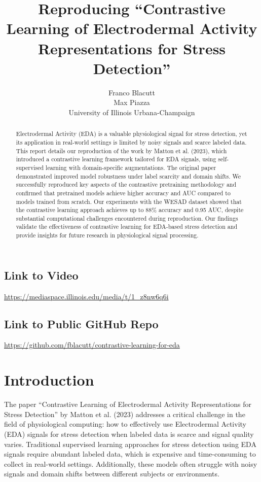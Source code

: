 \documentclass[10pt,letterpaper,twocolumn]{article}
\title{\Large\bf Reproducing ``Contrastive Learning of Electrodermal Activity Representations for Stress Detection''}
\author{Franco Blacutt\\
Max Piazza\\
University of Illinois Urbana-Champaign}
\date{}
\begin{document}
\maketitle

\begin{abstract}
Electrodermal Activity (EDA) is a valuable physiological signal for stress detection, yet its application in real-world settings is limited by noisy signals and scarce labeled data. This report details our reproduction of the work by Matton et al. (2023), which introduced a contrastive learning framework tailored for EDA signals, using self-supervised learning with domain-specific augmentations. The original paper demonstrated improved model robustness under label scarcity and domain shifts. We successfully reproduced key aspects of the contrastive pretraining methodology and confirmed that pretrained models achieve higher accuracy and AUC compared to models trained from scratch. Our experiments with the WESAD dataset showed that the contrastive learning approach achieves up to 88\% accuracy and 0.95 AUC, despite substantial computational challenges encountered during reproduction. Our findings validate the effectiveness of contrastive learning for EDA-based stress detection and provide insights for future research in physiological signal processing.
\end{abstract}

\subsection*{Link to Video}

\url{https://mediaspace.illinois.edu/media/t/1_z8nw6q6i}

\subsection*{Link to Public GitHub Repo}

\url{https://github.com/fblacutt/contrastive-learning-for-eda}

\section{Introduction}

The paper ``Contrastive Learning of Electrodermal Activity Representations for Stress Detection'' by Matton et al. (2023) addresses a critical challenge in the field of physiological computing: how to effectively use Electrodermal Activity (EDA) signals for stress detection when labeled data is scarce and signal quality varies. Traditional supervised learning approaches for stress detection using EDA signals require abundant labeled data, which is expensive and time-consuming to collect in real-world settings. Additionally, these models often struggle with noisy signals and domain shifts between different subjects or environments.
\end{document}
